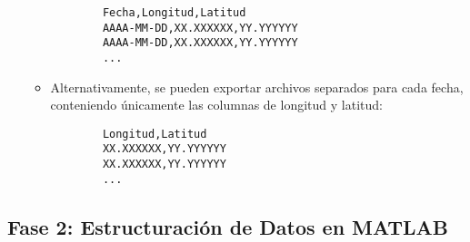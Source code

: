 \documentclass{article}
\begin{document}
\begin{itemize}
\begin{itemize}
        \begin{verbatim}
        Fecha,Longitud,Latitud
        AAAA-MM-DD,XX.XXXXXX,YY.YYYYYY
        AAAA-MM-DD,XX.XXXXXX,YY.YYYYYY
        ...
        \end{verbatim}
        \item Alternativamente, se pueden exportar archivos separados para cada fecha, conteniendo únicamente las columnas de longitud y latitud:
        \begin{verbatim}
        Longitud,Latitud
        XX.XXXXXX,YY.YYYYYY
        XX.XXXXXX,YY.YYYYYY
        ...
        \end{verbatim}
    \end{itemize}
\end{itemize}

\subsection*{Fase 2: Estructuración de Datos en MATLAB}
\end{document}
